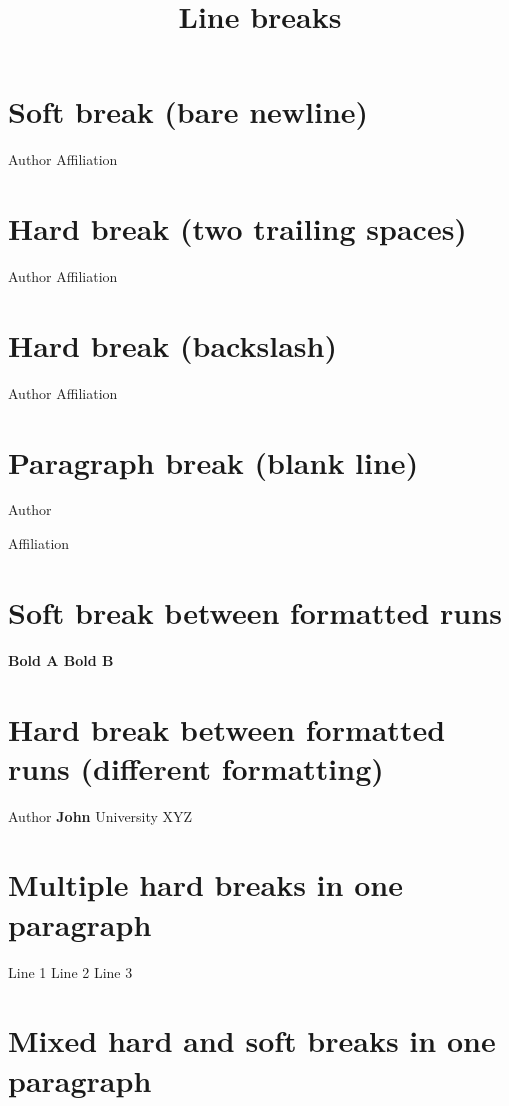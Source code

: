 \documentclass[11pt,a4paper]{article}
\title{Line breaks}
\begin{document}
\maketitle

\section{Soft break (bare newline)}

Author Affiliation

\section{Hard break (two trailing spaces)}

Author
Affiliation

\section{Hard break (backslash)}

Author
Affiliation

\section{Paragraph break (blank line)}

Author

Affiliation

\section{Soft break between formatted runs}

\textbf{Bold A Bold B}

\section{Hard break between formatted runs (different formatting)}

Author \textbf{John} 
University XYZ

\section{Multiple hard breaks in one paragraph}

Line 1
Line 2
Line 3

\section{Mixed hard and soft breaks in one paragraph}
\end{document}
